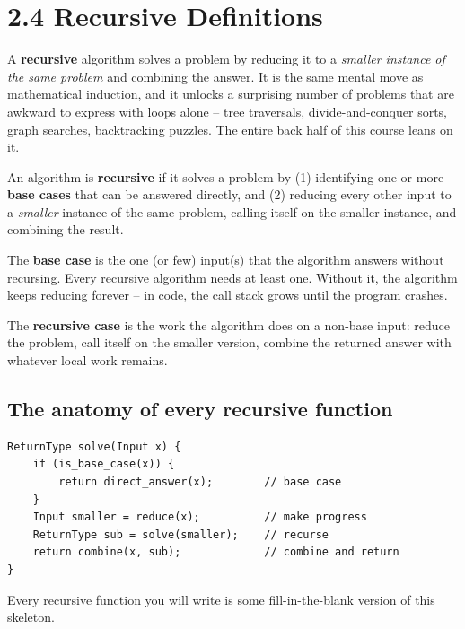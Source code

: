 \documentclass[11pt]{article}
\begin{document}
\section{2.4 Recursive Definitions}

A \textbf{recursive} algorithm solves a problem by reducing it to a
\emph{smaller instance of the same problem} and combining the answer.
It is the same mental move as mathematical induction, and it unlocks a
surprising number of problems that are awkward to express with loops
alone -- tree traversals, divide-and-conquer sorts, graph searches,
backtracking puzzles. The entire back half of this course leans on it.

\begin{defnbox}
An algorithm is \textbf{recursive} if it solves a problem by (1)
identifying one or more \textbf{base cases} that can be answered
directly, and (2) reducing every other input to a \emph{smaller}
instance of the same problem, calling itself on the smaller instance,
and combining the result.
\end{defnbox}

\begin{defnbox}
The \textbf{base case} is the one (or few) input(s) that the algorithm
answers without recursing. Every recursive algorithm needs at least
one. Without it, the algorithm keeps reducing forever -- in code, the
call stack grows until the program crashes.
\end{defnbox}

\begin{defnbox}
The \textbf{recursive case} is the work the algorithm does on a
non-base input: reduce the problem, call itself on the smaller
version, combine the returned answer with whatever local work
remains.
\end{defnbox}

\subsection{The anatomy of every recursive function}

\begin{examplebox}
\begin{verbatim}
ReturnType solve(Input x) {
    if (is_base_case(x)) {
        return direct_answer(x);        // base case
    }
    Input smaller = reduce(x);          // make progress
    ReturnType sub = solve(smaller);    // recurse
    return combine(x, sub);             // combine and return
}
\end{verbatim}
Every recursive function you will write is some fill-in-the-blank
version of this skeleton.
\end{examplebox}
\end{document}
